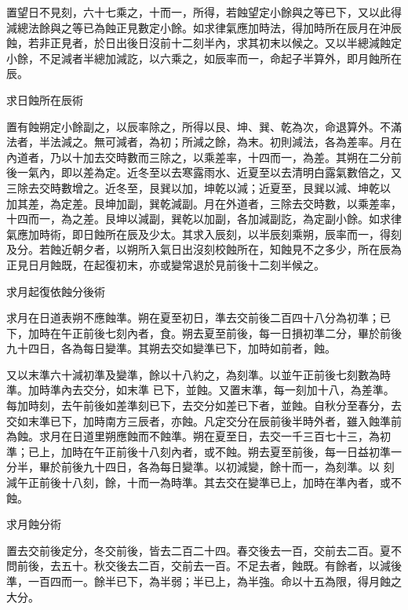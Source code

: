 \begin{pinyinscope}
 置望日不見刻，六十七乘之，十而一，所得，若蝕望定小餘與之等已下，又以此得減總法餘與之等已為蝕正見數定小餘。如求律氣應加時法，得加時所在辰月在沖辰蝕，若非正見者，於日出後日沒前十二刻半內，求其初末以候之。又以半總減蝕定小餘，不足減者半總加減訖，以六乘之，如辰率而一，命起子半算外，即月蝕所在辰。



 求日蝕所在辰術



 置有蝕朔定小餘副之，以辰率除之，所得以艮、坤、巽、乾為次，命退算外。不滿法者，半法減之。無可減者，為初；所減之餘，為末。初則減法，各為差率。月在內道者，乃以十加去交時數而三除之，以乘差率，十四而一，為差。其朔在二分前後一氣內，即以差為定。近冬至以去寒露雨水、近夏至以去清明白露氣數倍之，又三除去交時數增之。近冬至，艮巽以加，坤乾以減；近夏至，艮巽以減、坤乾以
 加其差，為定差。艮坤加副，巽乾減副。月在外道者，三除去交時數，以乘差率，十四而一，為之差。艮坤以減副，巽乾以加副，各加減副訖，為定副小餘。如求律氣應加時術，即日蝕所在辰及少太。其求入辰刻，以半辰刻乘朔，辰率而一，得刻及分。若蝕近朝夕者，以朔所入氣日出沒刻校蝕所在，知蝕見不之多少，所在辰為正見日月蝕既，在起復初末，亦或變常退於見前後十二刻半候之。



 求月起復依蝕分後術



 求月在日道表朔不應蝕準。朔在夏至初日，準去交前後二百四十八分為初準；已下，加時在午正前後七刻內者，食。朔去夏至前後，每一日損初準二分，畢於前後九十四日，各為每日變準。其朔去交如變準已下，加時如前者，蝕。



 又以末準六十減初準及變準，餘以十八約之，為刻準。以並午正前後七刻數為時準。加時準內去交分，如末準
 已下，並蝕。又置末準，每一刻加十八，為差準。每加時刻，去午前後如差準刻已下，去交分如差已下者，並蝕。自秋分至春分，去交如末準已下，加時南方三辰者，亦蝕。凡定交分在辰前後半時外者，雖入蝕準前為蝕。求月在日道里朔應蝕而不蝕準。朔在夏至日，去交一千三百七十三，為初準；已上，加時在午正前後十八刻內者，或不蝕。朔去夏至前後，每一日益初準一分半，畢於前後九十四日，各為每日變準。以初減變，餘十而一，為刻準。以
 刻減午正前後十八刻，餘，十而一為時準。其去交在變準已上，加時在準內者，或不蝕。



 求月蝕分術



 置去交前後定分，冬交前後，皆去二百二十四。春交後去一百，交前去二百。夏不問前後，去五十。秋交後去二百，交前去一百。不足去者，蝕既。有餘者，以減後準，一百四而一。餘半已下，為半弱；半已上，為半強。命以十五為限，得月蝕之大分。




\end{pinyinscope}
